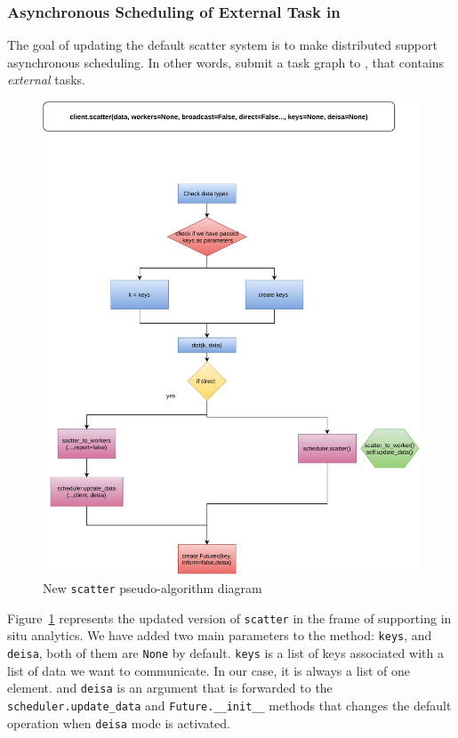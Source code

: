 \subsubsection{Asynchronous Scheduling of External Task in \dask}\label{sec:asynchscheduling}

The goal of updating the default scatter system is to make \dask distributed support asynchronous scheduling. In other words, submit a task graph to \dask, that contains \textit{external} tasks. 

\begin{figure}\centering
\includegraphics[scale=0.65]{figures/Dask-scatter().pdf}
\caption{New \texttt{scatter} pseudo-algorithm diagram}
\label{figscatter}
\end{figure}

Figure~\ref{figscatter} represents the updated version of \texttt{scatter} in the frame of supporting in situ analytics. We have added two main parameters to the method: \texttt{keys}, and \texttt{deisa}, both of them are \texttt{None} by default. \texttt{keys} is a list of keys associated with a list of data we want to communicate. In our case, it is always a list of one element. and \texttt{deisa} is an argument that is forwarded to the \texttt{scheduler.update\_data} and \texttt{Future.\_\_init\_\_}  methods  that changes the default operation when \texttt{deisa} mode is activated.

